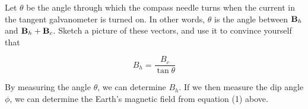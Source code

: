 Let $\theta$ be the angle through which the compass needle turns
when the current in the tangent galvanometer is turned on.
In other words, $\theta$ is the angle between ${\bf B}_h$ and
${\bf B}_h+{\bf B}_c$.  Sketch a picture of these vectors, and
use it to convince yourself that

%
%
%
%

\begin{equation}
B_h = \frac{B_c}{\tan\theta} 
\end{equation}

\vskip 1in

By measuring the angle $\theta$, we can determine $B_h$.  
If we then measure the dip angle $\phi$, we can determine
the Earth's magnetic field from equation (1) above.

